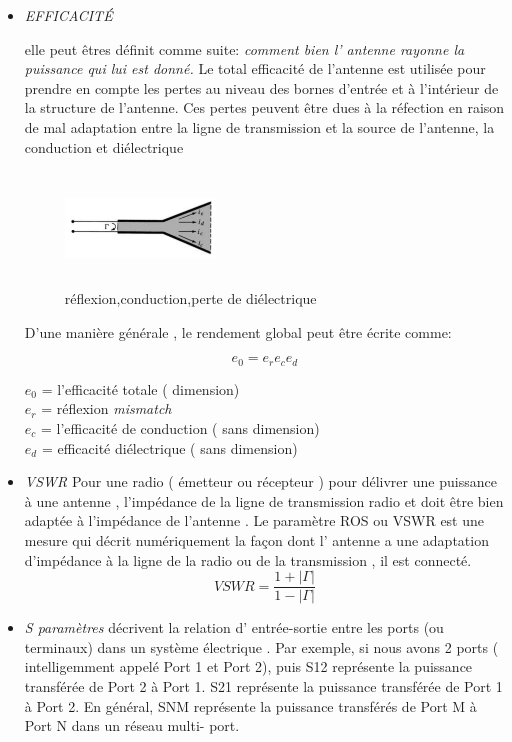 \documentclass[11pt, a4paper, twoside]{book}
\begin{document}
\begin{itemize}
\item \emph{EFFICACITÉ}

elle peut êtres définit comme suite: \emph{comment bien l' antenne rayonne la puissance qui lui est donné.} Le total efficacité de l'antenne est utilisée pour prendre en compte les pertes au niveau des bornes d'entrée et à l'intérieur de la structure de l'antenne. Ces pertes peuvent être dues  à la réfection en raison de mal adaptation entre la ligne de transmission et la source de l'antenne, la conduction et diélectrique

\begin{figure}[H]
\centering
\includegraphics[width=4cm,height=3cm]{wellwellwell}
\caption{réflexion,conduction,perte de diélectrique}
\end{figure}
D'une manière générale , le rendement global peut être écrite comme:

\begin{equation}
e_{0}=e_{r}e_{c}e_{d}
\end{equation}

\(e_{0}\) = l'efficacité totale ( dimension)\\
\(e_{r}\) = réflexion \emph{ mismatch} \\
\(e_{c}\) = l'efficacité de conduction ( sans dimension)\\
\(e_{d}\) = efficacité diélectrique ( sans dimension)\\

\item \emph{VSWR} 
Pour une radio ( émetteur ou récepteur ) pour délivrer une puissance à une antenne , l'impédance de la ligne de transmission radio et doit être bien adaptée à l'impédance de l'antenne . Le paramètre ROS ou VSWR est une mesure qui décrit numériquement la façon dont l' antenne a une adaptation d'impédance à la ligne de la radio ou de la transmission , il est connecté.
\begin{equation}
VSWR = \dfrac{1+ |\Gamma|}{1-|\Gamma|}
\end{equation}

\item \emph{S paramètres}
décrivent la relation d' entrée-sortie entre les ports (ou terminaux) dans un système électrique . Par exemple, si nous avons 2 ports ( intelligemment appelé Port 1 et Port 2), puis S12 représente la puissance transférée de Port 2 à Port 1. S21 représente la puissance transférée de Port 1 à Port 2. En général, SNM représente la puissance transférés de Port M à Port N dans un réseau multi- port.
\end{itemize}
\end{document}
